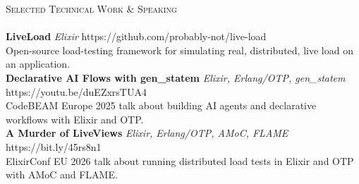 \documentclass[a4paper]{article}
\newcommand{\lineunder} {
    \vspace*{-8pt} \\
    \hspace*{-18pt} \hrulefill \\
}
\newcommand{\header} [1] {
    {\hspace*{-18pt}\vspace*{6pt} \textsc{#1}}
    \vspace*{-6pt} \lineunder
}
\begin{document}
\header{Selected Technical Work \& Speaking}
{\textbf{LiveLoad}} {\sl Elixir} \hfill https://github.com/probably-not/live-load\\
Open-source load-testing framework for simulating real, distributed, live load on an application.\\
\vspace*{2mm}
{\textbf{Declarative AI Flows with gen\_statem}} {\sl Elixir, Erlang/OTP, gen\_statem} \hfill https://youtu.be/duEZxrsTUA4\\
CodeBEAM Europe 2025 talk about building AI agents and declarative workflows with Elixir and OTP.\\
\vspace*{2mm}
{\textbf{A Murder of LiveViews}} {\sl Elixir, Erlang/OTP, AMoC, FLAME} \hfill https://bit.ly/45rs8n1\\
ElixirConf EU 2026 talk about running distributed load tests in Elixir and OTP with AMoC and FLAME.\\
\vspace{1mm}
\end{document}
